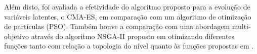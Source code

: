 Além disto, foi avaliada a efetividade do algoritmo proposto para a evolução de variáveis latentes, o CMA-ES, em comparação com um algoritmo de otimização de partículas (PSO). Também houve a comparação com uma abordagem multi-objetivo através do algoritmo NSGA-II proposto em \cite{Deb:02} otimizando diferentes funções tanto com relação a topologia do nível quanto às funções propostas em \cite{marioGAN}.




